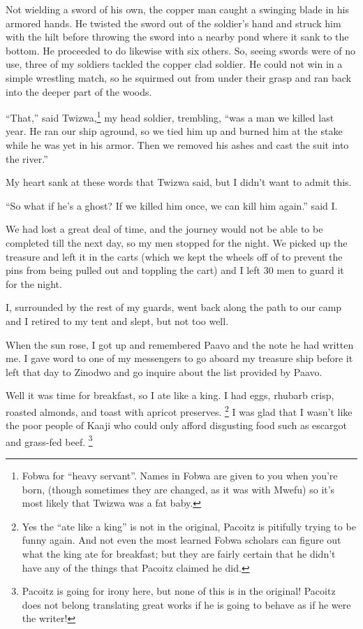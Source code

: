 Not wielding a sword of his own, the copper man caught a swinging blade in his armored hands. He twisted the sword out of the soldier's hand and struck him with the hilt before throwing the sword into a nearby pond where it sank to the bottom. He proceeded to do likewise with six others. So, seeing swords were of no use, three of my soldiers tackled the copper clad soldier. He could not win in a simple wrestling match, so he squirmed out from under their grasp and ran back into the deeper part of the woods.

``That,'' said Twizwa,\footnote{Fo\-bwa for ``heavy servant''. Names in Fo\-bwa are given to you when you're born, (though sometimes they are changed, as it was with Mwefu) so it's most likely that Twizwa was a fat baby.} my head soldier, trembling, ``was a man we killed last year. He ran our ship aground, so we tied him up and burned him at the stake while he was yet in his armor. Then we removed his ashes and cast the suit into the river.''

My heart sank at these words that Twizwa said, but I didn't want to admit this.

``So what if he's a ghost? If we killed him once, we can kill him again.'' said I.

We had lost a great deal of time, and the journey would not be able to be completed till the next day, so my men stopped for the night.
We picked up the treasure and left it in the carts (which we kept the wheels off of to prevent the pins from being pulled out and toppling the cart) and I left 30 men to guard it for the night.

I, surrounded by the rest of my guards, went back along the path to our camp and I retired to my tent and slept, but not too well.

\tbreak

When the sun rose, I got up and remembered Paavo and the note he had written me. I gave word to one of my messengers to go aboard my treasure ship before it left that day to Zinodwo and go inquire about the list provided by Paavo. 

Well it was time for breakfast, so I ate like a king. I had eggs, rhubarb crisp, roasted almonds, and toast with apricot preserves. \footnote{Yes the ``ate like a king'' is not in the original, Pacoitz is pitifully trying to be funny again. And not even the most learned Fo\-bwa scholars can figure out what the king ate for breakfast; but they are fairly certain that he didn't have any of the things that Pacoitz claimed he did.}
I was glad that I wasn't like the poor people of Kaaji who could only afford disgusting food such as escargot and grass-fed beef. \footnote{Pacoitz is going for irony here, but none of this is in the original! Pacoitz does not belong translating great works if he is going to behave as if he were the writer!}

